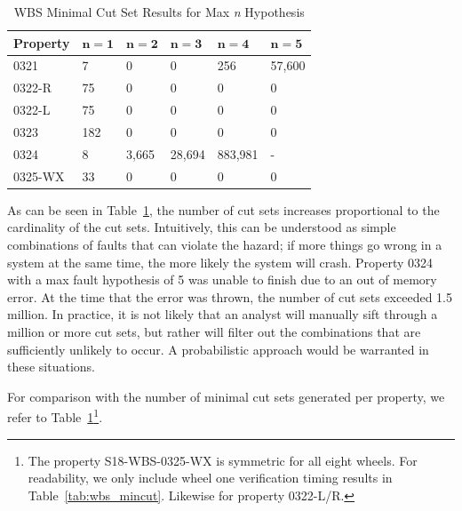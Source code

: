 \begin{table}[htbp]
\begin{center}
    \begin{tabular}{ | l | l | l | l | l | l |}
    \hline
    \textbf{Property} & $\bm{n = 1}$ & $\bm{n = 2}$ & $\bm{n = 3}$ & $\bm{n = 4}$ 
		& $\bm{n = 5}$    \\ \hline \hline
    0321 & 7 & 0 & 0 & 256 & 57,600   \\ \hline
    0322-R & 75 & 0 & 0 & 0 & 0  \\ \hline
    0322-L & 75 & 0 & 0 & 0 & 0  \\ \hline
    0323 & 182 & 0 & 0 & 0 & 0  \\ \hline
    0324 & 8 & 3,665 & 28,694 & 883,981 & - \\ \hline
    0325-WX & 33 & 0 & 0 &0 &0 \\ \hline
    \end{tabular}
    \caption{WBS Minimal Cut Set Results for Max \textit{n} Hypothesis}
    \label{tab:wbs_maxN_results}
    \end{center}
\end{table}


As can be seen in Table~\ref{tab:wbs_maxN_results}, the number of cut sets increases proportional to the cardinality of the cut sets. Intuitively, this can be understood as simple combinations of faults that can violate the hazard; if more things go wrong in a system at the same time, the more likely the system will crash. Property 0324 with a max fault hypothesis of 5 was unable to finish due to an out of memory error. At the time that the error was thrown, the number of cut sets exceeded 1.5 million. In practice, it is not likely that an analyst will manually sift through a million or more cut sets, but rather will filter out the combinations that are sufficiently unlikely to occur. A probabilistic approach would be warranted in these situations. 

For comparison with the number of minimal cut sets generated per property, we refer to Table~\ref{tab:wbs_maxN_results}\footnote{The property S18-WBS-0325-WX is symmetric for all eight wheels. For readability, we only include wheel one verification timing results in Table~\ref{tab:wbs_mincut}. Likewise for property 0322-L/R.}.


